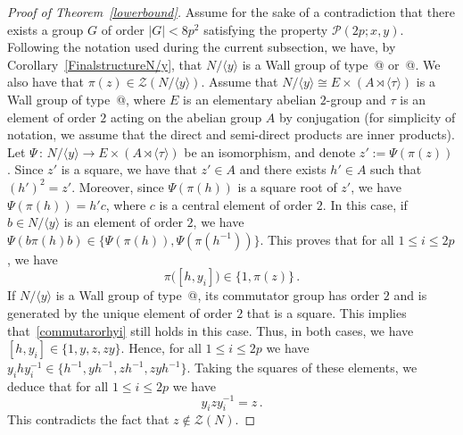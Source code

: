 \documentclass[12pt]{amsart}
\makeatletter
\numberwithin{equation}{section}
\newcommand*{\rom}[1]{\expandafter\@slowromancap\romannumeral #1@}
\theoremstyle{definition}
\theoremstyle{remark}
\makeatother
\begin{document}
\begin{proof}[Proof of Theorem~\ref{lowerbound}]
    Assume for the sake of a contradiction that there exists a group $G$ of order $|G|<8p^2$ satisfying the property $\mathcal{P}(2p;x,y)$. Following the notation used during the current subsection, we have, by Corollary~\ref{FinalstructureN/y}, that $N/\langle y\rangle$ is a Wall group of type~\rom{1} or~\rom{3}. We also have that $\pi(z)\in \mathcal{Z}(N/\langle y\rangle)$. Assume that $N/\langle y\rangle\cong E\times (A\rtimes \langle \tau\rangle)$ is a Wall group of type~\rom{1}, where $E$ is an elementary abelian $2$-group and $\tau$ is an element of order $2$ acting on the abelian group $A$ by conjugation (for simplicity of notation, we assume that the direct and semi-direct products are inner products). Let $\Psi\, \colon\,  N/\langle y\rangle\to E\times (A\rtimes \langle \tau\rangle) $ be an isomorphism, and denote $z':=\Psi(\pi(z))$. Since $z'$ is a square, we have that $z'\in A$ and there exists $h'\in A$ such that $(h')^2=z' $. Moreover, since $\Psi (\pi(h))$ is a square root of $z'$, we have $\Psi (\pi(h))=h'c$, where $c$ is a central element of order $2$. In this case, if $b\in N/\langle y\rangle$ is an element of order $2$, we have $\Psi(b\pi(h) b)\in \{\Psi(\pi(h)), \Psi(\pi(h^{-1}))\}$. This proves that for all $1\le i\le 2p$, we have \begin{equation}\label{commutarorhyi}
            \pi\bigl([h,y_i]\bigr)\in \{1,\pi(z)\}\, .
        \end{equation}
    If $N/\langle y\rangle$ is a Wall group of type~\rom{3}, its commutator group has order $2$ and is generated by the unique element of order $2$ that is a square. This implies that~\eqref{commutarorhyi} still holds in this case. Thus, in both cases, we have $[h,y_i]\in \{ 1, y, z ,zy\} $. Hence, for all $1\le i\le 2p$ we have $y_i h y_i^{-1}\in \{ h^{-1},yh^{-1},zh^{-1},zy h^{-1}\}$. Taking the squares of these elements, we deduce that for all $1\le i\le 2p$ we have \[y_i zy_i^{-1}=z\, .\]
    This contradicts the fact that $z\notin \mathcal{Z}(N)$.
\end{proof}
\end{document}

